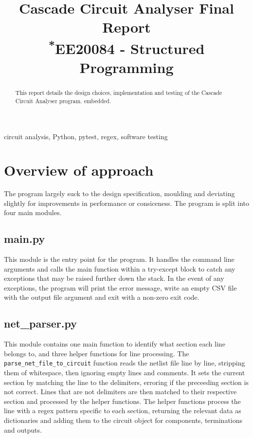 \documentclass[conference]{IEEEtran}
\begin{document}
\title{Cascade Circuit Analyser Final Report\\
{\footnotesize \textsuperscript{*}EE20084 - Structured Programming}
}

\author{
}
\maketitle

\begin{abstract}
    This report details the design choices, implementation and testing of the Cascade Circuit Analyser program.
    embedded.
\end{abstract}

\begin{IEEEkeywords}
    circuit analysis, Python, pytest, regex, software testing
\end{IEEEkeywords}

\tableofcontents

\section{Overview of approach}
The program largely suck to the design specification, moulding and deviating slightly for improvements in performance
or consiceness. The program is split into four main modules.

\subsection{main.py}
This module is the entry point for the program. It handles the command line arguments and calls the main function within
a try-except block to catch any exceptions that may be raised further down the stack. In the event of any exceptions, the
program will print the error message, write an empty CSV file with the output file argument and exit with a non-zero exit code.

\subsection{net\_parser.py}
This module contains one main function to identify what section each line belongs to, and three helper functions for line processing.
The \texttt{parse\_net\_file\_to\_circuit} function reads the netlist file line by line, stripping them of whitespace, then ignoring
empty lines and comments. It sets the current section by matching the line to the delimiters, erroring if the preceeding section is not
correct. Lines that are not delimiters are then matched to their respective section and processed by the helper functions. The helper
functions process the line with a regex pattern specific to each section, returning the relevant data as dictionaries and
adding them to the circuit object for components, terminations and outputs. 
\end{document}

